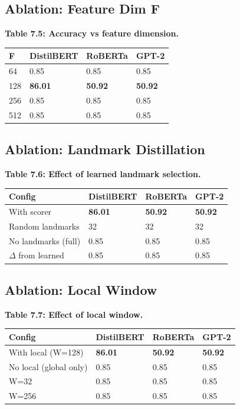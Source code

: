 \subsection{Ablation: Feature Dim F}

\textbf{Table 7.5: Accuracy vs feature dimension.}

\begin{table}[H]
\centering
\small
\begin{tabular}{llll}
\toprule
\textbf{F} & \textbf{DistilBERT} & \textbf{RoBERTa} & \textbf{GPT-2} \\
\midrule
64 & 0.85 & 0.85 & 0.85 \\
128 & \textbf{86.01} & \textbf{50.92} & \textbf{50.92} \\
256 & 0.85 & 0.85 & 0.85 \\
512 & 0.85 & 0.85 & 0.85 \\
\bottomrule
\end{tabular}
\end{table}

\subsection{Ablation: Landmark Distillation}

\textbf{Table 7.6: Effect of learned landmark selection.}

\begin{table}[H]
\centering
\small
\begin{tabular}{llll}
\toprule
\textbf{Config} & \textbf{DistilBERT} & \textbf{RoBERTa} & \textbf{GPT-2} \\
\midrule
With scorer & \textbf{86.01} & \textbf{50.92} & \textbf{50.92} \\
Random landmarks & 32 & 32 & 32 \\
No landmarks (full) & 0.85 & 0.85 & 0.85 \\
$\Delta$ from learned & 0.85 & 0.85 & 0.85 \\
\bottomrule
\end{tabular}
\end{table}

\subsection{Ablation: Local Window}

\textbf{Table 7.7: Effect of local window.}

\begin{table}[H]
\centering
\small
\begin{tabular}{llll}
\toprule
\textbf{Config} & \textbf{DistilBERT} & \textbf{RoBERTa} & \textbf{GPT-2} \\
\midrule
With local (W=128) & \textbf{86.01} & \textbf{50.92} & \textbf{50.92} \\
No local (global only) & 0.85 & 0.85 & 0.85 \\
W=32 & 0.85 & 0.85 & 0.85 \\
W=256 & 0.85 & 0.85 & 0.85 \\
\bottomrule
\end{tabular}
\end{table}

